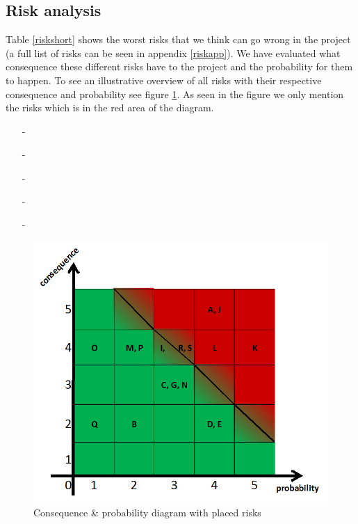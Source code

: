 \subsection{Risk analysis}
\label{risk}


Table \ref{riskshort} shows the worst risks that we think can go wrong in the project (a full list of risks can be seen in appendix \ref{riskapp}). We have evaluated what consequence these different risks have to the project and the probability for them to happen. To see an illustrative overview of all risks with their respective consequence and probability see figure \ref{cxp}. As seen in the figure we only mention the risks which is in the red area of the diagram.

\begin{itemize}
\item[-] 
\item[-] 
\item[-] 
\item[-] 
\item[-] 
\end{itemize}

\begin{figure}[h!]
\centering
\label{cxp}
\includegraphics[scale=0.4]{./graphics/cxp}
\caption{Consequence \& probability diagram with placed risks}
\end{figure}

